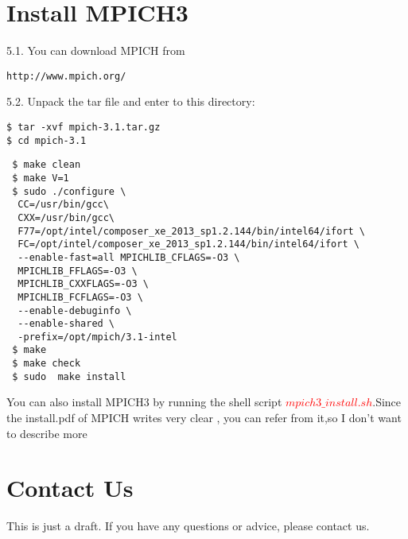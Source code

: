 \documentclass[paper=a4, fontsize=11pt]{scrartcl}
\numberwithin{equation}{section}
\numberwithin{figure}{section}
\numberwithin{table}{section}
\begin{document}
 \LARGE{\section{Install MPICH3}}
\Large{5.1}. You can download MPICH from 
{\color{Brown}\begin{verbatim}
http://www.mpich.org/
\end{verbatim}}
\large{5.2}. Unpack the tar file and enter to this directory:
{\color{blue}\begin{verbatim}
$ tar -xvf mpich-3.1.tar.gz
$ cd mpich-3.1
\end{verbatim}}
{\color{blue}\begin{verbatim}
 $ make clean
 $ make V=1
 $ sudo ./configure \
  CC=/usr/bin/gcc\
  CXX=/usr/bin/gcc\
  F77=/opt/intel/composer_xe_2013_sp1.2.144/bin/intel64/ifort \
  FC=/opt/intel/composer_xe_2013_sp1.2.144/bin/intel64/ifort \
  --enable-fast=all MPICHLIB_CFLAGS=-O3 \
  MPICHLIB_FFLAGS=-O3 \
  MPICHLIB_CXXFLAGS=-O3 \
  MPICHLIB_FCFLAGS=-O3 \
  --enable-debuginfo \
  --enable-shared \
  -prefix=/opt/mpich/3.1-intel
 $ make
 $ make check
 $ sudo  make install
 \end{verbatim}}
 You can also install MPICH3 by running  the shell script \textcolor{red}{$mpich3\_install.sh$}.Since the install.pdf of MPICH writes very  clear ,
 you can refer from it,so I don't want to describe more
 \LARGE{\section{Contact Us}}
\normalsize{This is just a draft. If you have any questions or advice, please contact us.}
\end{document}
